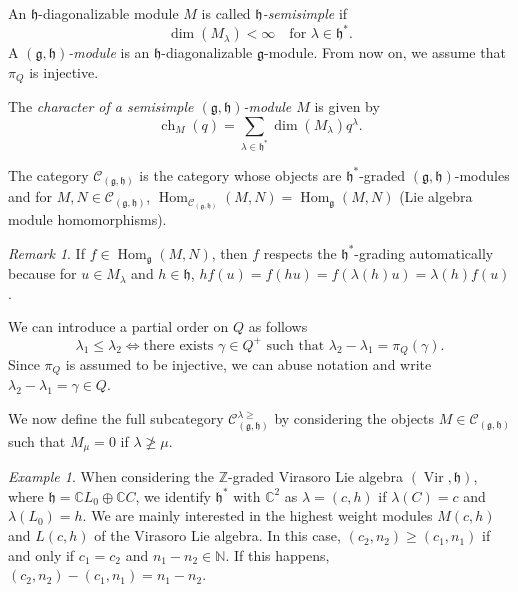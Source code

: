 \documentclass[a4paper, 12pt, reqno]{amsart}
\theoremstyle{remark}
\newtheorem{remark}[theorem]{Remark}
\newtheorem{example}[theorem]{Example}
\DeclareMathOperator{\Vir}{Vir}
\DeclareMathOperator{\ch}{ch}
\DeclareMathOperator{\Hom}{Hom}
\begin{document}
An $\mathfrak{h}$-diagonalizable module $M$ is called \emph{$\mathfrak{h}$-semisimple} if
\begin{equation*}
  \dim(M_{\lambda}) < \infty \quad \text{for $\lambda \in \mathfrak{h}^*$}.
\end{equation*}
A \emph{$(\mathfrak{g}, \mathfrak{h})$-module} is an $\mathfrak{h}$-diagonalizable $\mathfrak{g}$-module.
From now on, we assume that $\pi_Q$ is injective.

The \emph{character of a semisimple $(\mathfrak{g}, \mathfrak{h})$-module $M$} is given by
\begin{equation*}
  \ch_M(q) = \sum_{\lambda \in \mathfrak{h}^*}\dim(M_{\lambda})q^{\lambda}.
\end{equation*}

The category $\mathcal{C}_{(\mathfrak{g}, \mathfrak{h})}$ is the category whose objects are $\mathfrak{h}^*$-graded $(\mathfrak{g}, \mathfrak{h})$-modules and for $M, N \in \mathcal{C}_{(\mathfrak{g}, \mathfrak{h})}$, $\Hom_{\mathcal{C}_{(\mathfrak{g}, \mathfrak{h})}}(M, N) = \Hom_{\mathfrak{g}}(M, N)$ (Lie algebra module homomorphisms).

\begin{remark}
  \label{rmk:1}
  If $f \in \Hom_{\mathfrak{g}}(M, N)$, then $f$ respects the $\mathfrak{h}^*$-grading automatically because for $u \in M_{\lambda}$ and $h \in \mathfrak{h}$, $hf(u) = f(hu) = f(\lambda(h)u) = \lambda(h)f(u)$.
\end{remark}

We can introduce a partial order on $Q$ as follows
\begin{equation*}
  \lambda_1 \le \lambda_2 \iff \text{there exists $\gamma \in Q^+$ such that $\lambda_2 - \lambda_1 = \pi_Q(\gamma)$.}
\end{equation*}
Since $\pi_Q$ is assumed to be injective, we can abuse notation and write $\lambda_2 - \lambda_1 = \gamma \in Q$.

We now define the full subcategory $\mathcal{C}^{\lambda \ge}_{(\mathfrak{g}, \mathfrak{h})}$ by considering the objects $M \in \mathcal{C}_{(\mathfrak{g}, \mathfrak{h})}$ such that $M_{\mu} = 0$ if $\lambda \ngeq \mu$.

\begin{example}
  \label{exa:3}
  When considering the $\mathbb{Z}$-graded Virasoro Lie algebra $(\Vir, \mathfrak{h})$, where $\mathfrak{h} = \mathbb{C}L_0 \oplus \mathbb{C}C$, we identify $\mathfrak{h}^*$ with $\mathbb{C}^2$ as $\lambda = (c, h)$ if $\lambda(C) = c$ and $\lambda(L_0) = h$.
  We are mainly interested in the highest weight modules $M(c, h)$ and $L(c, h)$ of the Virasoro Lie algebra.
  In this case, $(c_2, n_2) \ge (c_1, n_1)$ if and only if $c_1 = c_2$ and $n_1 - n_2 \in \mathbb{N}$.
  If this happens, $(c_2, n_2) - (c_1, n_1) = n_1 - n_2$.
\end{example}
\end{document}

